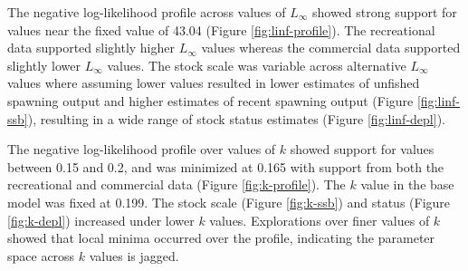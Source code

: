 \documentclass[11pt,
  english,
  a4paper,
]{article}
\begin{document}
\leavevmode\tagmcend\tagstructend\par


The negative log-likelihood profile across values of {\(L_{\infty}\)\leavevmode\tagmcend\tagstructend} showed strong support for values near the fixed value of 43.04 (Figure \ref{fig:linf-profile}). The recreational data supported slightly higher {\(L_{\infty}\)\leavevmode\tagmcend\tagstructend} values whereas the commercial data supported slightly lower {\(L_{\infty}\)\leavevmode\tagmcend\tagstructend} values. The stock scale was variable across alternative {\(L_{\infty}\)\leavevmode\tagmcend\tagstructend} values where assuming lower values resulted in lower estimates of unfished spawning output and higher estimates of recent spawning output (Figure \ref{fig:linf-ssb}), resulting in a wide range of stock status estimates (Figure \ref{fig:linf-depl}).

\leavevmode\tagmcend\tagstructend\par


The negative log-likelihood profile over values of {\(k\)\leavevmode\tagmcend\tagstructend} showed support for values between 0.15 and 0.2, and was minimized at 0.165 with support from both the recreational and commercial data (Figure \ref{fig:k-profile}). The {\(k\)\leavevmode\tagmcend\tagstructend} value in the base model was fixed at 0.199. The stock scale (Figure \ref{fig:k-ssb}) and status (Figure \ref{fig:k-depl}) increased under lower {\(k\)\leavevmode\tagmcend\tagstructend} values. Explorations over finer values of {\(k\)\leavevmode\tagmcend\tagstructend} showed that local minima occurred over the profile, indicating the parameter space across {\(k\)\leavevmode\tagmcend\tagstructend} values is jagged.

\leavevmode\tagmcend\tagstructend\par

\end{document}
